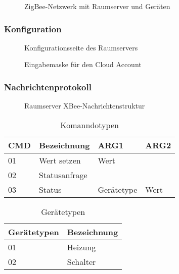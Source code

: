\begin{figure}[htb]
\centering
{}
\caption{ZigBee-Netzwerk mit Raumserver und Geräten}
\label{fig:CBRSED}
\end{figure}

\subsubsection{Konfiguration}\label{RoomConfig}

\begin{figure}[htb]
\centering
{}
\caption{Konfigurationsseite des Raumservers}
\label{fig:ConfigRaum}
\end{figure}

\begin{figure}[htb]
\centering
{}
\caption{Eingabemaske für den Cloud Account}
\label{fig:ConfigRaum_Login}
\end{figure}






\subsubsection{Nachrichtenprotokoll}\label{Protokoll}

\begin{figure}[htb]
\centering
{}
\caption{Raumserver XBee-Nachrichtenstruktur}
\label{fig:Frame}
\end{figure}


\begin{table}[]
\centering
\begin{tabular}{|l|l|l|l|}
\hline
\textbf{CMD} & \textbf{Bezeichnung} & \textbf{ARG1} & \textbf{ARG2} \\ \hline
01            & Wert setzen          & Wert          &               \\ \hline
02            & Statusanfrage        &               &               \\ \hline
03            & Status               & Gerätetype    & Wert          \\ \hline
\end{tabular}
\caption{Komanndotypen}
\label{CMDS}
\end{table}
\begin{table}[]
\centering
\begin{tabular}{|l|l|}
\hline
\textbf{Gerätetypen} & \textbf{Bezeichnung} \\ \hline
01                    & Heizung           \\ \hline
02                    & Schalter             \\ \hline
\end{tabular}
\caption{Gerätetypen}
\label{Devices}
\end{table}

